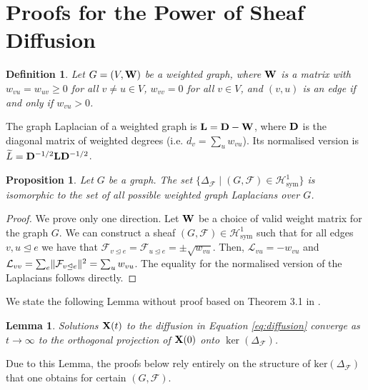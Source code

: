 \documentclass{article}
\newtheorem{lemma}[theorem]{Lemma}
\newtheorem{proposition}[theorem]{Proposition}
\newtheorem{definition}[theorem]{Definition}
\def\mD{{\bf{D}}}
\def\mL{{\bf{L}}}
\def\mW{{\bf{W}}}
\def\mX{{\bf{X}}}
\def\gF{{\mathcal{F}}}
\def\gH{{\mathcal{H}}}
\def\gL{{\mathcal{L}}}
\newcommand{\tleq}{\trianglelefteq}
\DeclarePairedDelimiter{\norm}{\lVert}{\rVert}
\begin{document}
\section{Proofs for the Power of Sheaf Diffusion}\label{app:diffusion_power}

\begin{definition}
Let $G = (V, \mW)$ be a weighted graph, where $\mW$ is a matrix with $w_{vu} = w_{uv} \geq 0$ for all $v \neq u \in V$, $w_{vv} = 0$ for all $v \in V$, and $(v, u)$ is an edge if and only if $w_{vu} > 0$. 
\end{definition}

The graph Laplacian of a weighted graph is $\mL = \mD - \mW$, where $\mD$ is the diagonal matrix of weighted degrees (i.e. $d_{v} = \sum_u w_{vu}$). Its normalised version is $\widetilde{L} = \mD^{-1/2} \mL \mD^{-1/2}$. 

\begin{proposition}
Let $G$ be a graph. The set $\{ \Delta_\gF \mid (G, \gF) \in \gH^1_{\mathrm{sym}}\}$ is isomorphic to the set of all possible weighted graph Laplacians over $G$. 
\end{proposition}

\begin{proof}
We prove only one direction. Let $\mW$ be a choice of valid weight matrix for the graph $G$. We can construct a sheaf $(G, \gF) \in \gH^1_{\mathrm{sym}}$ such that for all edges $v, u \tleq e$ we have that $\gF_{v \tleq e} = \gF_{u \tleq e} = \pm\sqrt{w_{vu}}$. Then, $\gL_{vu} = -w_{vu}$ and $\gL_{vv} = \sum_e \norm{\gF_{v \tleq e}}^2 = \sum_u w_{vu}$. The equality for the normalised version of the Laplacians follows directly.
\end{proof}

We state the following Lemma without proof based on Theorem 3.1 in \citet{hansen2021opinion}. 

\begin{lemma}\label{lemma:harmonic_convergence}
Solutions $\mX(t)$ to the diffusion in Equation \ref{eq:diffusion} converge as $t \to \infty$ to the orthogonal projection of $\mX(0)$ onto $\ker(\Delta_\gF)$. 
\end{lemma}

Due to this Lemma, the proofs below rely entirely on the structure of $\mathrm{ker}(\Delta_\gF)$ that one obtains for certain $(G, \gF)$. 
\end{document}
